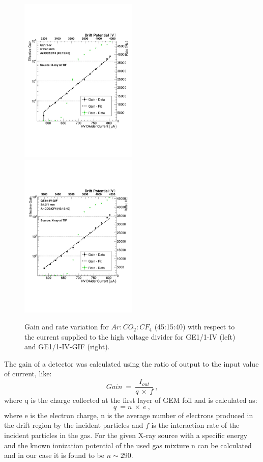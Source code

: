 \begin{figure}[!htbp]
    \centering
    \includegraphics[width=0.5\textwidth]{figures/GEM/Gain_curve_GE11_IV_Ar_CO2_CF4.pdf}%
    \includegraphics[width=0.5\textwidth]{figures/GEM/Gain_curve_GE11_IV_GIF_Ar_CO2_CF4.pdf}
    \caption{Gain and rate variation for $Ar:CO_2:CF_4$ (45:15:40) with respect to the current supplied to the high voltage divider for GE1/1-IV (left) and GE1/1-IV-GIF (right).}
    \label{fig:gain_GE1/1_IV_GIF}
\end{figure}
The gain of a detector was calculated using the ratio of output to the input value of current, like:
\begin{equation}
    Gain~=~\frac{I_{out}}{q~\times~f}~,
\end{equation}
where q is the charge collected at the first layer of GEM foil and is calculated as:
\begin{equation}
    q~= n~\times~e~,
\end{equation}
where e is the electron charge, n is the average number of electrons produced in the drift region by the incident particles and $f$ is the interaction rate of the incident particles in the gas. For the given X-ray source with a specific energy and the known ionization potential of the used gas mixture n can be calculated and in our case it is found to be $n \sim 290$.

